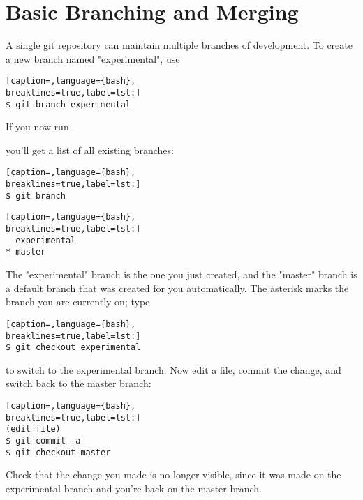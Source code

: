 \section{Basic Branching and Merging}
A single git repository can maintain multiple branches of development. To
create a new branch named "experimental", use

\lstset{basicstyle=\scriptsize, numbers=none, captionpos=b, tabsize=4}
\begin{lstlisting}[caption=,language={bash},
breaklines=true,label=lst:]
$ git branch experimental
\end{lstlisting}

If you now run

you'll get a list of all existing branches:

\lstset{basicstyle=\scriptsize, numbers=none, captionpos=b, tabsize=4}
\begin{lstlisting}[caption=,language={bash},
breaklines=true,label=lst:]
$ git branch
\end{lstlisting}

\lstset{basicstyle=\scriptsize, numbers=none, captionpos=b, tabsize=4}
\begin{lstlisting}[caption=,language={bash},
breaklines=true,label=lst:]
  experimental
* master
\end{lstlisting}

The "experimental" branch is the one you just created, and the "master" branch
is a default branch that was created for you automatically. The asterisk marks
the branch you are currently on; type

\lstset{basicstyle=\scriptsize, numbers=none, captionpos=b, tabsize=4}
\begin{lstlisting}[caption=,language={bash},
breaklines=true,label=lst:]
$ git checkout experimental
\end{lstlisting}

to switch to the experimental branch. Now edit a file, commit the change, and
switch back to the master branch:

\lstset{basicstyle=\scriptsize, numbers=none, captionpos=b, tabsize=4}
\begin{lstlisting}[caption=,language={bash},
breaklines=true,label=lst:]
(edit file)
$ git commit -a
$ git checkout master
\end{lstlisting}

Check that the change you made is no longer visible, since it was made on the
experimental branch and you're back on the master branch.


